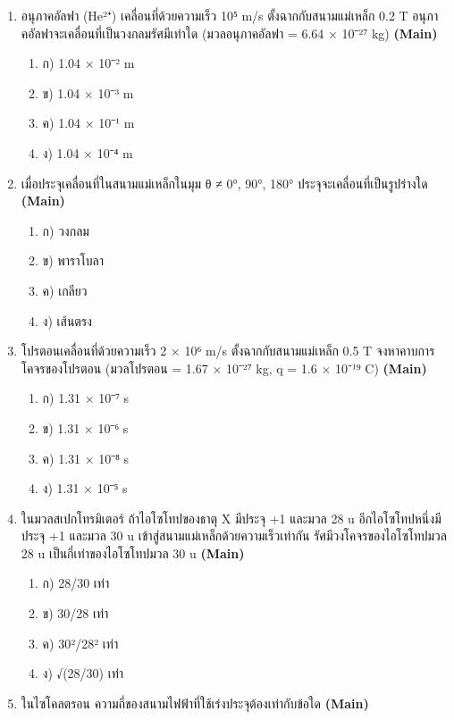 \documentclass[12pt]{article}
\begin{document}
\begin{enumerate}[label=\arabic*.]
\begin{enumerate}[label=)]
\item ค) ไม่สามารถเร่งประจุบวกได้
\item ง) ไม่สามารถทำงานในสุญญากาศ
\end{enumerate}
\item อนุภาคอัลฟา (He²⁺) เคลื่อนที่ด้วยความเร็ว 10⁵ m/s ตั้งฉากกับสนามแม่เหล็ก 0.2 T อนุภาคอัลฟาจะเคลื่อนที่เป็นวงกลมรัศมีเท่าใด (มวลอนุภาคอัลฟา = 6.64 × 10⁻²⁷ kg) \hfill \textbf{\small (Main)}
\begin{enumerate}[label=)]
\item ก) 1.04 × 10⁻² m
\item ข) 1.04 × 10⁻³ m
\item ค) 1.04 × 10⁻¹ m
\item ง) 1.04 × 10⁻⁴ m
\end{enumerate}
\item เมื่อประจุเคลื่อนที่ในสนามแม่เหล็กในมุม θ ≠ 0°, 90°, 180° ประจุจะเคลื่อนที่เป็นรูปร่างใด \hfill \textbf{\small (Main)}
\begin{enumerate}[label=)]
\item ก) วงกลม
\item ข) พาราโบลา
\item ค) เกลียว
\item ง) เส้นตรง
\end{enumerate}
\item โปรตอนเคลื่อนที่ด้วยความเร็ว 2 × 10⁶ m/s ตั้งฉากกับสนามแม่เหล็ก 0.5 T จงหาคาบการโคจรของโปรตอน (มวลโปรตอน = 1.67 × 10⁻²⁷ kg, q = 1.6 × 10⁻¹⁹ C) \hfill \textbf{\small (Main)}
\begin{enumerate}[label=)]
\item ก) 1.31 × 10⁻⁷ s
\item ข) 1.31 × 10⁻⁶ s
\item ค) 1.31 × 10⁻⁸ s
\item ง) 1.31 × 10⁻⁵ s
\end{enumerate}
\item ในมวลสเปกโทรมิเตอร์ ถ้าไอโซโทปของธาตุ X มีประจุ +1 และมวล 28 u อีกไอโซโทปหนึ่งมีประจุ +1 และมวล 30 u เข้าสู่สนามแม่เหล็กด้วยความเร็วเท่ากัน รัศมีวงโคจรของไอโซโทปมวล 28 u เป็นกี่เท่าของไอโซโทปมวล 30 u \hfill \textbf{\small (Main)}
\begin{enumerate}[label=)]
\item ก) 28/30 เท่า
\item ข) 30/28 เท่า
\item ค) 30²/28² เท่า
\item ง) √(28/30) เท่า
\end{enumerate}
\item ในไซโคลตรอน ความถี่ของสนามไฟฟ้าที่ใช้เร่งประจุต้องเท่ากับข้อใด \hfill \textbf{\small (Main)}

\end{enumerate}
\end{document}
